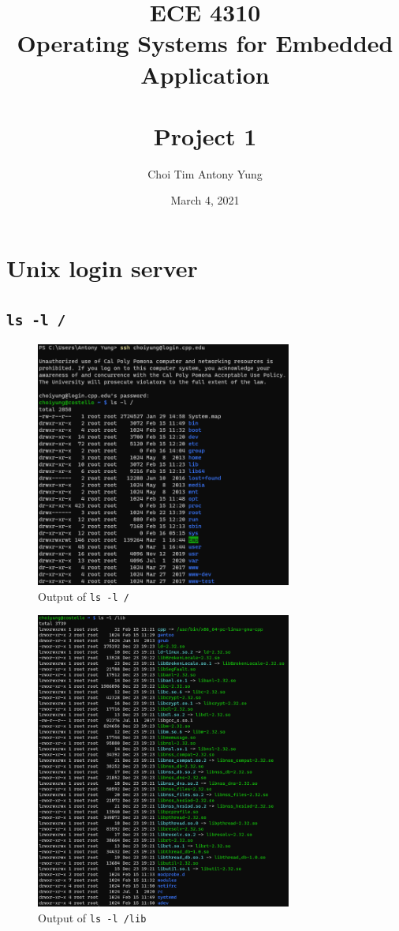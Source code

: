 \documentclass{article}
\title{ECE 4310\\Operating Systems for Embedded Application\\\,\\Project 1}
\author{Choi Tim Antony Yung}
\date{March 4, 2021}
\begin{document}
\maketitle

\thispagestyle{empty}
\setcounter{page}{0}

\newpage

\section{Unix login server}

\subsection{\texttt{ls -l /}}

\begin{figure}[H]

  \caption{Output of \texttt{ls -l /}}
  \centering
  \includegraphics[width=0.75\textwidth]{ECE4310_proj1_part1_1a.png}
\end{figure}

\begin{figure}[H]
  \caption{Output of \texttt{ls -l /lib}}
  \centering
  \includegraphics[width=0.75\textwidth]{ECE4310_proj1_part1_1b.png}
\end{figure}
\end{document}

